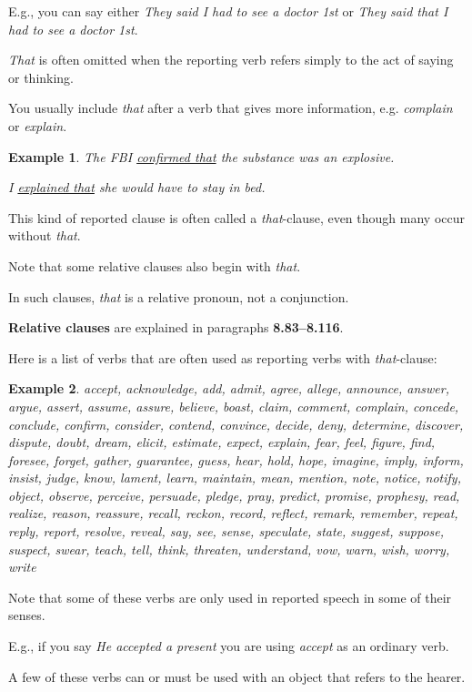 \documentclass[oneside]{book}
\numberwithin{equation}{section}
\newtheorem{example}{Example}[section]
\begin{document}
E.g., you can say either \textit{They said I had to see a doctor 1st} or \textit{They said that I had to see a doctor 1st}.

%
\textit{That} is often omitted when the reporting verb refers simply to the act of saying or thinking.

You usually include \textit{that} after a verb that gives more information, e.g. \textit{complain} or \textit{explain}.
\begin{example}
    The FBI \underline{confirmed that} the substance was an explosive.
    
    I \underline{explained that} she would have to stay in bed.    
\end{example}
This kind of reported clause is often called a \textit{that}-clause, even though many occur without \textit{that}.

%
Note that some relative clauses also begin with \textit{that}.

In such clauses, \textit{that} is a relative pronoun, not a conjunction.

\textbf{Relative clauses} are explained in paragraphs \textbf{8.83--8.116}.

%
\noindent{} Here is a list of verbs that are often used as reporting verbs with \textit{that}-clause:
\begin{example}
    accept, acknowledge, add, admit, agree, allege, announce, answer, argue, assert, assume, assure, believe, boast, claim, comment, complain, concede, conclude, confirm, consider, contend, convince, decide, deny, determine, discover, dispute, doubt, dream, elicit, estimate, expect, explain, fear, feel, figure, find, foresee, forget, gather, guarantee, guess, hear, hold, hope, imagine, imply, inform, insist, judge, know, lament, learn, maintain, mean, mention, note, notice, notify, object, observe, perceive, persuade, pledge, pray, predict, promise, prophesy, read, realize, reason, reassure, recall, reckon, record, reflect, remark, remember, repeat, reply, report, resolve, reveal, say, see, sense, speculate, state, suggest, suppose, suspect, swear, teach, tell, think, threaten, understand, vow, warn, wish, worry, write
\end{example}
Note that some of these verbs are only used in reported speech in some of their senses.

E.g., if you say \textit{He accepted a present} you are using \textit{accept} as an ordinary verb.

%
A few of these verbs can or must be used with an object that refers to the hearer.
\end{document}
